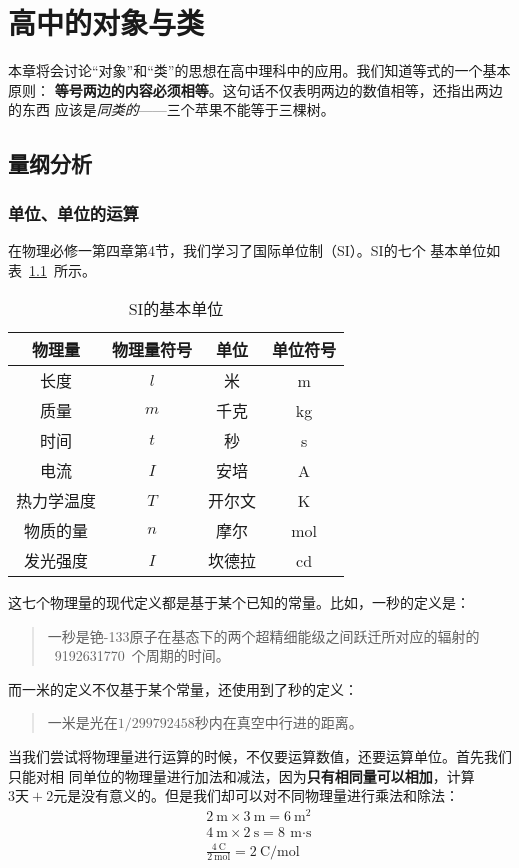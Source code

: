 \chapter{高中的对象与类}

本章将会讨论“对象”和“类”的思想在高中理科中的应用。我们知道等式的一个基本原则：
\textbf{等号两边的内容必须相等}。这句话不仅表明两边的数值相等，还指出两边的东西
应该是\emph{同类的}——三个苹果不能等于三棵树。

\section{量纲分析}

\subsection{单位、单位的运算}

在物理必修一第四章第4节，我们学习了国际单位制（SI）。SI的七个
基本单位如表~\ref{tbl:si_units}~所示。

\begin{table}[ht]
    \centering
    \caption{SI的基本单位}\label{tbl:si_units}
    \begin{tabular}{cccc}
        \toprule
        物理量 & 物理量符号 & 单位 & 单位符号 \\
        \midrule
        长度 & $l$ & 米 & \unit{m} \\
        质量 & $m$ & 千克 & \unit{kg} \\
        时间 & $t$ & 秒 & \unit{s} \\
        电流 & $I$ & 安培 & \unit{A} \\
        热力学温度 & $T$ & 开尔文 & \unit{K} \\
        物质的量 & $n$ & 摩尔 & \unit{mol} \\
        发光强度 & $I$ & 坎德拉 & \unit{cd} \\
        \bottomrule
    \end{tabular}
\end{table}

这七个物理量的现代定义都是基于某个已知的常量。比如，一秒的定义是：
\begin{quote}
    一秒是铯-133原子在基态下的两个超精细能级之间跃迁所对应的辐射的%
    ~\num{9192631770}~个周期的时间。
\end{quote}
而一米的定义不仅基于某个常量，还使用到了秒的定义：
\begin{quote}
    一米是光在$1/\num{299792458}$秒内在真空中行进的距离。
\end{quote}

当我们尝试将物理量进行运算的时候，不仅要运算数值，还要运算单位。首先我们只能对相
同单位的物理量进行加法和减法，因为\textbf{只有相同量可以相加}，计算$3\text{天}
+2\text{元}$是没有意义的。但是我们却可以对不同物理量进行乘法和除法：
\begin{gather*}
    \qty{2}{\meter} \times \qty{3}{\meter} = \qty{6}{\meter^2}\\
    \qty{4}{\meter} \times \qty{2}{\second} = \qty{8}{\meter\cdot\second}\\
    \frac{\qty{4}{\coulomb}}{\qty{2}{\mole}} = \qty{2}{\coulomb\per\mole}\\
\end{gather*}

